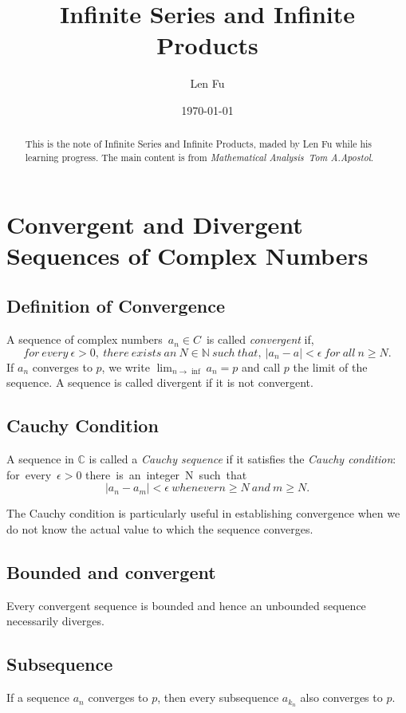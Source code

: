 \documentclass{article}
\title{Infinite Series and Infinite Products}
\author{Len Fu}
\date{\today}
\begin{document}
\maketitle

\begin{abstract}
This is the note of Infinite Series and Infinite Products,
 maded by Len Fu while his learning progress.
 The main content is from \textit{Mathematical Analysis\ Tom A.Apostol}.
\end{abstract}
\newpage

\renewcommand{\contentsname}{Contents}
\tableofcontents
\newpage

\section{Convergent and Divergent Sequences of Complex Numbers}
\subsection{Definition of Convergence}
A sequence of complex numbers\ $a_{n}\in C$\ is called \textit{convergent} if,
$$for\ every\ \epsilon>0,\ there\ exists\ an\ N\in\mathbb{N}\ such\ that,\
|a_{n}-a|<\epsilon\ for\ all\ n\geq N.$$
If ${a_{n}}$ converges to $p$, we write $\lim_{n\rightarrow\inf}a_{n}=p$ and call
$p$ the limit of the sequence. A sequence is called divergent if it is not convergent.

\subsection{Cauchy Condition}
A sequence in $\mathbb{C}$ is called a \textit{Cauchy sequence} if it satisfies the 
\textit{Cauchy condition}:
for\ every\ $\epsilon>0$ there\ is\ an\ integer\ N\ such\ that\
$$|a_{n}-a_{m}|<\epsilon\ whenever n\geq N\ and\ m\geq N.$$

The Cauchy condition is particularly useful in establishing 
convergence when we do not know the actual value to which 
the sequence converges.

\subsection{Bounded and convergent}
Every convergent sequence is bounded and hence an unbounded sequence 
necessarily diverges.

\subsection{Subsequence}
If a sequence ${a_{n}}$ converges to $p$, then every subsequence ${a_{k_{n}}}$ 
also converges to $p$.
\end{document}
